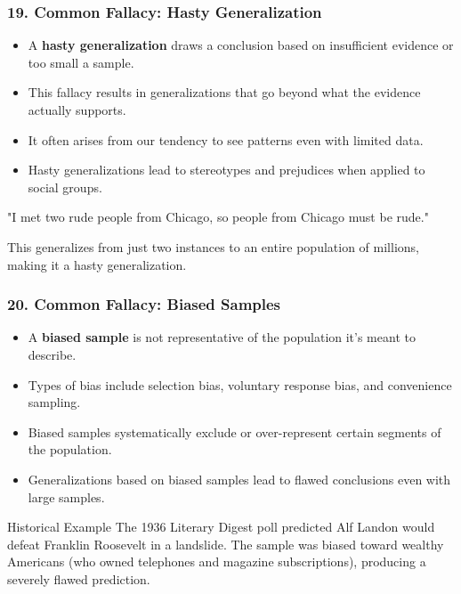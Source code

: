 \documentclass{beamer}
\begin{document}
\begin{frame}
\frametitle{19. Common Fallacy: Hasty Generalization}
\begin{itemize}
\item A \textbf{hasty generalization} draws a conclusion based on insufficient evidence or too small a sample.
\item This fallacy results in generalizations that go beyond what the evidence actually supports.
\item It often arises from our tendency to see patterns even with limited data.
\item Hasty generalizations lead to stereotypes and prejudices when applied to social groups.
\end{itemize}

\begin{example}
"I met two rude people from Chicago, so people from Chicago must be rude."

This generalizes from just two instances to an entire population of millions, making it a hasty generalization.
\end{example}
\end{frame}


\begin{frame}
\frametitle{20. Common Fallacy: Biased Samples}
\begin{itemize}
\item A \textbf{biased sample} is not representative of the population it's meant to describe.
\item Types of bias include selection bias, voluntary response bias, and convenience sampling.
\item Biased samples systematically exclude or over-represent certain segments of the population.
\item Generalizations based on biased samples lead to flawed conclusions even with large samples.
\end{itemize}

\begin{alertblock}{Historical Example}
The 1936 Literary Digest poll predicted Alf Landon would defeat Franklin Roosevelt in a landslide. The sample was biased toward wealthy Americans (who owned telephones and magazine subscriptions), producing a severely flawed prediction.
\end{alertblock}
\end{frame}
\end{document}
